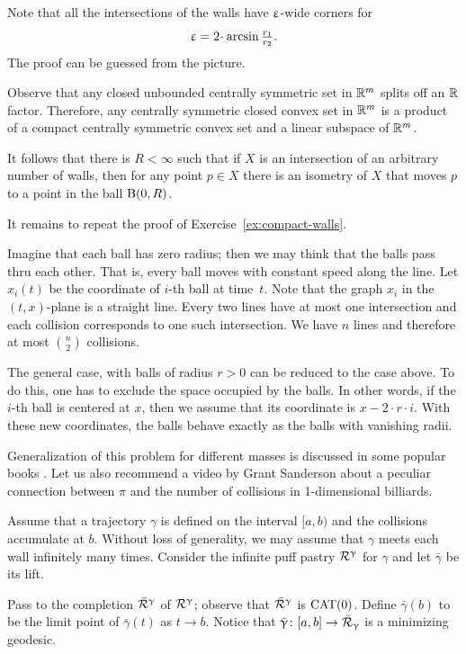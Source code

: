 Note that all the intersections of the walls have $\upvarepsilon$-wide corners for
\[\eps=2\cdot \arcsin\tfrac{r_1}{r_2}.\]
The proof can be guessed from the picture.

Observe that any closed unbounded centrally symmetric set in $\mathbb{R}^m$ splits off an $\mathbb{R}$ factor.
Therefore, any centrally symmetric closed convex set in $\mathbb{R}^m$ is a product of a compact centrally symmetric convex set and a linear subspace of $\mathbb{R}^m$.

It follows that there is $R<\infty$
such that if $X$ is an intersection of an arbitrary number of walls, then for any point $p\in X$ there is an isometry of $X$ 
that moves $p$ to a point in the ball $\mathrm{B}{}(0,R)$.

It remains to repeat the proof of Exercise~\ref{ex:compact-walls}.

Imagine that each ball has zero radius; then we may think that the balls pass thru each other.
That is, every ball moves with constant speed along the line.
Let $x_i(t)$ be the coordinate of $i$-th ball at time~$t$.
Note that the graph $x_i$ in the $(t,x)$-plane is a straight line.
Every two lines have at most one intersection and each collision corresponds to one such intersection.
We have $n$ lines and therefore at most $\binom n2$ collisions.

The general case, with balls of radius $r>0$ can be reduced to the case above.
To do this, one has to exclude the space occupied by the balls.
In other words, if the $i$-th ball is centered at $x$, then we assume that its coordinate is
$x-2\cdot r\cdot i$.
With these new coordinates, the balls behave exactly as the balls with vanishing radii.

Generalization of this problem for different masses is discussed in some popular books \cite{galperin-zemlyakov,tabachnikov}.
Let us also recommend a video by Grant Sanderson \cite{sanderson} about a peculiar connection between $\pi$ and the number of collisions in 1-dimensional billiards.

Assume that a trajectory $\gamma$ is defined on the interval $[a,b)$
and the collisions accumulate at $b$.
Without loss of generality, we may assume that $\gamma$ meets each wall infinitely many times.
Consider the infinite puff pastry $\mathcal{R}^\upgamma$ for $\gamma$
and let $\bar\gamma$ be its lift.

Pass to the completion $\bar{\mathcal{R}}^\upgamma$ of $\mathcal{R}^\upgamma$;
observe that $\bar{\mathcal{R}}^\upgamma$ is $\mathrm{CAT}(0)$.
Define $\bar\gamma(b)$ to be the limit point of $\bar\gamma(t)$ as $t\to b$.
Notice that $\bar\gamma\:[a,b]\to \bar{\spc{R}}_\gamma$ is a minimizing geodesic.

